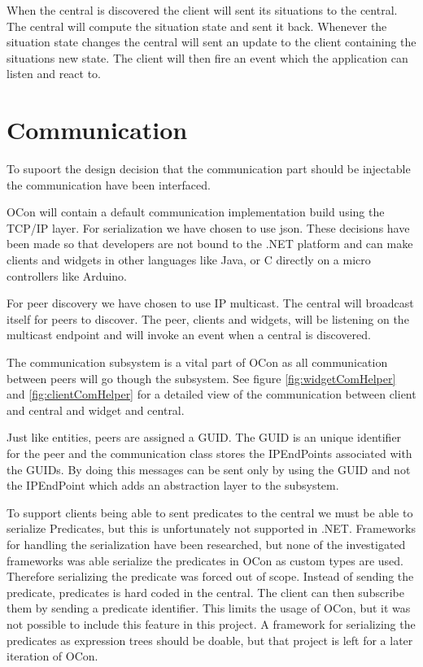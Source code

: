 \documentclass[../report.tex]{subfiles}
\begin{document}
When the central is discovered the client will sent its situations to the central. The central will compute the situation state and sent it back. Whenever the situation state changes the central will sent an update to the client containing the situations new state. The client will then fire an event which the application can listen and react to.

\section{Communication}

To supoort the design decision that the communication part should be injectable the communication have been interfaced.

OCon will contain a default communication implementation build using the TCP/IP layer. For serialization we have chosen to use json. These decisions have been made so that developers are not bound to the .NET platform and can make clients and widgets in other languages like Java, or C directly on a micro controllers like Arduino.

For peer discovery we have chosen to use IP multicast. The central will broadcast itself for peers to discover. The peer, clients and widgets, will be listening on the multicast endpoint and will invoke an event when a central is discovered.

The communication subsystem is a vital part of OCon as all communication between peers will go though the subsystem. See figure \ref{fig:widgetComHelper} and \ref{fig:clientComHelper} for a detailed view of the communication between client and central and widget and central.

Just like entities, peers are assigned a GUID. The GUID is an unique identifier for the peer and the communication class stores the IPEndPoints associated with the GUIDs. By doing this messages can be sent only by using the GUID and not the IPEndPoint which adds an abstraction layer to the subsystem.

To support clients being able to sent predicates to the central we must be able to serialize Predicates, but this is unfortunately not supported in .NET. Frameworks for handling the serialization have been researched, but none of the investigated frameworks was able serialize the predicates in OCon as custom types are used. Therefore serializing the predicate was forced out of scope. Instead of sending the predicate, predicates is hard coded in the central. The client can then subscribe them by sending a predicate identifier. This limits the usage of OCon, but it was not possible to include this feature in this project. A framework for serializing the predicates as expression trees should be doable, but that project is left for a later iteration of OCon.
\end{document}
